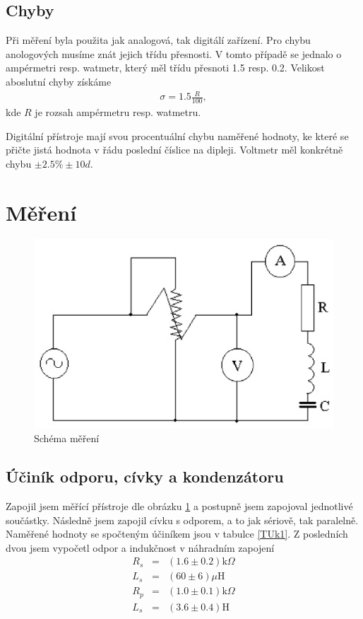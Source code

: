 \documentclass[a4paper,12pt]{article}
\begin{document}
\subsection{Chyby}
Při měření byla použita jak analogová, tak digitálí zařízení. Pro chybu anologových musíme 
znát jejich třídu přesnosti. V tomto případě se jednalo o ampérmetri resp. watmetr, který měl třídu 
přesnoti 1.5 resp. 0.2. Velikost aboslutní chyby získáme
\begin{eqnarray}
\sigma=1.5\frac{R}{100},
\end{eqnarray}
kde $R$ je rozsah ampérmetru resp. watmetru.

Digitální přístroje mají svou procentuální chybu naměřené hodnoty, ke které se přičte jistá hodnota v řádu poslední číslice na dipleji. Voltmetr měl 
konkrétně chybu $\pm 2.5\% \pm 10d$.

\section{Měření}
\begin{figure}
\includegraphics{sch1.eps}
\caption{Schéma měření}
\label{sch1}
\end{figure}

\subsection{Účiník odporu, cívky a kondenzátoru}
Zapojil jsem měřící přístroje dle obrázku \ref{sch1} a postupně jsem zapojoval jednotlivé součástky. Následně jsem zapojil cívku s odporem, a 
to jak sériově, tak paralelně. Naměřené hodnoty se spočteným účiníkem jsou v tabulce \ref{TUk1}. 
Z posledních dvou jsem vypočetl odpor a indukčnost v náhradním zapojení
\begin{eqnarray}
R_s&=&(1.6\pm0.2) \mbox{k}\Omega \\
L_s&=&(60\pm6) \mu\mbox{H}\\
R_p&=&(1.0\pm0.1) \mbox{k}\Omega \\
L_s&=&(3.6\pm0.4)\mbox{H}
\end{eqnarray}
\end{document}
